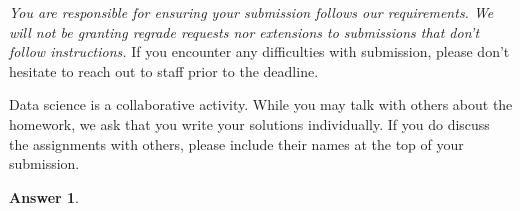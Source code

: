 \documentclass[addpoints, 12pt]{exam}
\theoremstyle{definition}
\newtheorem*{answer}{Answer}
\begin{document}
\noindent \textit{You are responsible for ensuring your submission follows our requirements. We will not be granting regrade requests nor extensions to submissions that don't follow instructions.} If you encounter any difficulties with submission, please don't hesitate to reach out to staff prior to the deadline.


\noindent Data science is a collaborative activity. While you may talk with others about the homework, we ask that you write your solutions individually. If you do discuss the assignments with others, please include their names at the top of your submission.


 
    \begin{shaded}
    \begin{answer}


    \end{answer}
    \end{shaded}




\newpage
\end{document}
